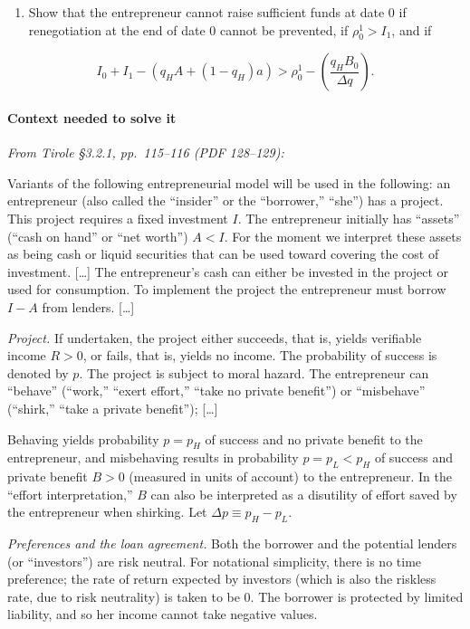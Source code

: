 \documentclass[11pt,a4paper]{article}
\providecommand{\tightlist}{\setlength{\itemsep}{0pt}\setlength{\parskip}{0pt}}
\begin{document}
\begin{enumerate}
\def\labelenumi{(\roman{enumi})}
\setcounter{enumi}{3}
\tightlist
\item
  Show that the entrepreneur cannot raise sufficient funds at date 0 if renegotiation at the end of
  date 0 cannot be prevented, if \(\rho_0^1 > I_1\), and if
\end{enumerate}

\[I_0 + I_1 - (q_HA + (1-q_H)a) > \rho_0^1 - \left(\frac{q_HB_0}{\Delta q}\right).\]

\paragraph{Context needed to solve it}

\emph{From Tirole §3.2.1, pp.~115--116 (PDF 128--129):}

Variants of the following entrepreneurial model will be used in the following: an entrepreneur (also
called the ``insider'' or the ``borrower,'' ``she'') has a project. This project requires a fixed
investment \(I\). The entrepreneur initially has ``assets'' (``cash on hand'' or ``net worth'')
\(A < I\). For the moment we interpret these assets as being cash or liquid securities that can be
used toward covering the cost of investment. {[}\ldots{]} The entrepreneur's cash can either be
invested in the project or used for consumption. To implement the project the entrepreneur must
borrow \(I - A\) from lenders. {[}\ldots{]}

\emph{Project.} If undertaken, the project either succeeds, that is, yields verifiable income
\(R > 0\), or fails, that is, yields no income. The probability of success is denoted by \(p\). The
project is subject to moral hazard. The entrepreneur can ``behave'' (``work,'' ``exert effort,''
``take no private benefit'') or ``misbehave'' (``shirk,'' ``take a private benefit''); {[}\ldots{]}

Behaving yields probability \(p = p_H\) of success and no private benefit to the entrepreneur, and
misbehaving results in probability \(p = p_L < p_H\) of success and private benefit \(B > 0\)
(measured in units of account) to the entrepreneur. In the ``effort interpretation,'' \(B\) can also
be interpreted as a disutility of effort saved by the entrepreneur when shirking. Let
\(\Delta p \equiv p_H - p_L\).

\emph{Preferences and the loan agreement.} Both the borrower and the potential lenders (or
``investors'') are risk neutral. For notational simplicity, there is no time preference; the rate of
return expected by investors (which is also the riskless rate, due to risk neutrality) is taken to
be 0. The borrower is protected by limited liability, and so her income cannot take negative values.
\end{document}
